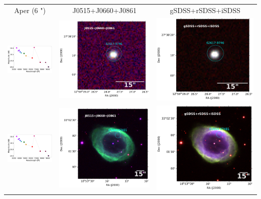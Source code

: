 \begin{table}
\begin{tabular}{ccc}
Aper (6 ") & J0515+J0660+J0861 & gSDSS+rSDSS+iSDSS \\
\includegraphics[width=0.3\linewidth, clip]{figs-pca/photospectrum_64343-69243-Missing-pne-allinf-v2_MAG_APER_6_0.pdf} & \includegraphics[width=0.3\linewidth, clip]{Field_62617/1000001-JPLUS-00588-v202006_J0861_62617-9746-RGB.pdf} & \includegraphics[width=0.3\linewidth, clip]{Field_62617/1000001-JPLUS-00588-v202006_iSDSS_62617-9746-RGB.pdf} \\
\includegraphics[width=0.3\linewidth, clip]{figs-pca/photospectrum_64343-69243-Missing-pne-allinf-v2_MAG_APER_6_0.pdf} & \includegraphics[width=0.3\linewidth, clip]{Field_63864/1000001-JPLUS-01066-v202006_J0861_63864-47481-RGB.pdf} & \includegraphics[width=0.3\linewidth, clip]{Field_63864/1000001-JPLUS-01066-v202006_iSDSS_63864-47481-RGB.pdf} \\

\end{tabular}
\end{table}
